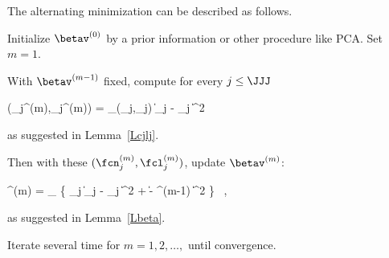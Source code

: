 The alternating minimization can be described as follows.
\begin{mylist}

\item 
Initialize \( \betav^{(0)} \) by a prior information or other procedure like PCA.
Set \( m=1 \).
\item 
With \( \betav^{(m-1)} \) fixed, compute for every \( j \leq \JJJ \)
\begin{EQA}[c]
	(\fcn_{j}^{(m)},\fcl_{j}^{(m)})
	=
	\inf_{(\fcn_{j},\fcl_{j})} \Bigl\| \Imav_{j} - \KSe_{j}  \Bigr\|^{2}
\end{EQA}
as suggested in Lemma~\ref{Lcjlj}.
\item 
Then with these \( (\fcn_{j}^{(m)},\fcl_{j}^{(m)}) \), update \( \betav^{(m)} \):
\begin{EQA}[c]
	\betav^{(m)}
	=
	\inf_{\betav} \Bigl\{ \sum_{j} \Bigl\| \Imav_{j} - \KSe_{j}  \Bigr\|^{2}
		+ \lambda \| \betav - \betav^{(m-1)} \|^{2} 
	\Bigr\}	
	\, ,
\end{EQA}
as suggested in Lemma~\ref{Lbeta}.
\item 
Iterate several time for \( m=1,2,\ldots, \) until convergence.
\end{mylist}

